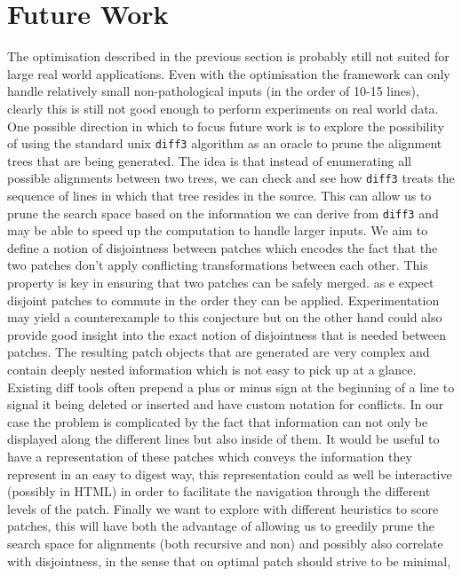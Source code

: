 \documentclass[11pt]{article}
\begin{document}
\section{Future Work}\label{future work}
The optimisation described in the previous section is probably still not suited 
for large real world applications. Even with the optimisation the framework can only handle relatively small 
non-pathological inputs (in the order of 10-15 lines), clearly this is still not good enough to perform experiments
on real world data. One possible direction in which to focus future work is to explore the 
possibility of using the standard unix \texttt{diff3} algorithm as an oracle to prune the 
alignment trees that are being generated. 
The idea is that instead of enumerating all possible alignments between two 
trees, we can check and see how \texttt{diff3} treats the sequence of lines in which that 
tree resides in the source. This can allow us to prune the search space based on 
the information we can derive from \texttt{diff3} and may be able to speed up 
the computation to handle larger inputs.
\vfill
We aim to define a notion of disjointness between patches which 
encodes the fact that the two patches don't apply conflicting transformations 
between each other. This property is key in ensuring that two patches can be safely merged. as e expect 
disjoint patches to commute in the order they can be applied. Experimentation may yield a counterexample to this conjecture but 
on the other hand could also provide good insight into the exact notion of 
disjointness that is needed between patches.
\vfill
The resulting patch objects that are generated are very complex and contain deeply nested information which is 
not easy to pick up at a glance. 
Existing diff tools often prepend a  plus or minus sign at the beginning of a line to signal it being deleted or 
inserted and have custom notation for conflicts. In our case the problem is 
complicated by the fact that information can not only be displayed along the 
different lines but also inside of them. 
It would be useful to have a representation of these patches which conveys the information 
they represent in an easy to digest way, this representation could as well be 
interactive (possibly in HTML) in order to facilitate the navigation through the 
different levels of the patch.
\vfill
Finally we want to explore with different heuristics to score patches, this will 
have both the advantage of allowing us to greedily prune the search space for 
alignments (both recursive and non) and possibly also correlate with 
disjointness, in the sense that on optimal patch should strive to be minimal, 
\end{document}

